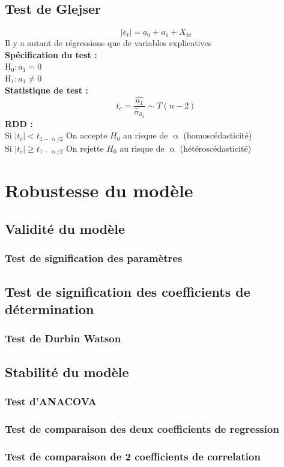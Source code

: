 \documentclass[A4paper]{article}
\begin{document}
\subsection{Test de Glejser}
\begin{equation*}
	|e_t| = a_0 + a_1 +X_{kt}
\end{equation*}
Il y a autant de régressions que de variables explicatives\\ 
\textbf{Spécification du test :}\\
H$_0 : a_1 = 0$\\
H$_1 : a_1 \neq 0$\\
\textbf{Statistique de test :}
\begin{equation*}
		t_c = \frac{\hat{a_1}}{\hat{\upsigma}_{\hat{a}_1}} \sim T(n-2)
\end{equation*}
\textbf{RDD : } \\
Si $|t_c|< t_{1-\upalpha/2}$ On accepte $H_0$ au risque de $\upalpha$ (homoscédasticité)\\
Si $|t_c| \geq t_{1-\upalpha/2}$ On rejette $H_0$ au risque de $\upalpha$ (hétéroscédasticité)\\
\section{Robustesse du modèle}
\subsection{Validité du modèle}
\subsubsection{Test de signification des paramètres}
\subsection{Test de signification des coefficients de détermination}
\subsubsection{Test de Durbin Watson}
\subsection{Stabilité du modèle}
\subsubsection{Test d'ANACOVA}
\subsubsection{Test de comparaison des deux coefficients de regression}
\subsubsection{Test de comparaison de 2 coefficients de correlation}
\end{document}
